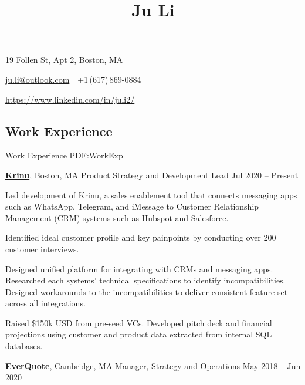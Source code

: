 \documentclass[letterpaper,10pt,oneside]{article}
\newcommand{\CVAuthor}{Ju Li}
\begin{document}

\title{\CVAuthor}

\begin{subtitle}
19 Follen St, Apt 2, Boston, MA
\par
\href{mailto:ju.li@outlook.com}
{ju.li@outlook.com}
\,\SubBulletSymbol\,
+1\,(617)\,869-0884
\par 
\href{https://www.linkedin.com/in/juli2/}{https://www.linkedin.com/in/juli2/}
\end{subtitle}

\begin{body}


\section
{Work\newline
Experience}
{Work Experience}
{PDF:WorkExp}

\href{https://krinu.com/}
{\textbf{Krinu}},
Boston, MA
\GapNoBreak
Product Strategy and Development Lead
\hfill
Jul 2020 -- Present
\begin{flushleft}

\BulletItem Led development of Krinu, a sales enablement tool that connects messaging apps such as WhatsApp, Telegram, and iMessage to Customer Relationship Management (CRM) systems such as Hubspot and Salesforce. 

\vspace{0.3em} \SubBulletItem 
Identified ideal customer profile and key painpoints by conducting over 200 customer interviews.  

\vspace{0.3em} \SubBulletItem Designed unified platform for integrating with CRMs and messaging apps. Researched each systems' technical specifications to identify incompatibilities. Designed workarounds to the incompatibilities to deliver consistent feature set across all integrations. 

\vspace{0.75em}
\BulletItem Raised \$150k USD from pre-seed VCs. Developed pitch deck and financial projections using customer and product data extracted from internal SQL databases. 

\end{flushleft}


\href{http://www.everquote.com/}
{\textbf{EverQuote}},
Cambridge, MA
\GapNoBreak
Manager, Strategy and Operations
\hfill
May 2018 -- Jun 2020
\begin{flushleft}


\end{flushleft}
\end{body}
\end{document}
